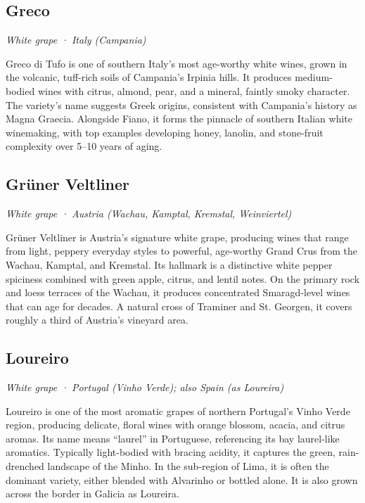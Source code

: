 \subsection*{Greco}
\textit{White grape · Italy (Campania)}\par\smallskip

Greco di Tufo is one of southern Italy’s most age-worthy white wines, grown in the volcanic, tuff-rich soils of Campania’s Irpinia hills. It produces medium-bodied wines with citrus, almond, pear, and a mineral, faintly smoky character. The variety’s name suggests Greek origins, consistent with Campania’s history as Magna Graecia. Alongside Fiano, it forms the pinnacle of southern Italian white winemaking, with top examples developing honey, lanolin, and stone-fruit complexity over 5–10 years of aging.

\subsection*{Grüner Veltliner}
\textit{White grape · Austria (Wachau, Kamptal, Kremstal, Weinviertel)}\par\smallskip

Grüner Veltliner is Austria’s signature white grape, producing wines that range from light, peppery everyday styles to powerful, age-worthy Grand Crus from the Wachau, Kamptal, and Kremstal. Its hallmark is a distinctive white pepper spiciness combined with green apple, citrus, and lentil notes. On the primary rock and loess terraces of the Wachau, it produces concentrated Smaragd-level wines that can age for decades. A natural cross of Traminer and St. Georgen, it covers roughly a third of Austria’s vineyard area.

\subsection*{Loureiro}
\textit{White grape · Portugal (Vinho Verde); also Spain (as Loureira)}\par\smallskip

Loureiro is one of the most aromatic grapes of northern Portugal’s Vinho Verde region, producing delicate, floral wines with orange blossom, acacia, and citrus aromas. Its name means “laurel” in Portuguese, referencing its bay laurel-like aromatics. Typically light-bodied with bracing acidity, it captures the green, rain-drenched landscape of the Minho. In the sub-region of Lima, it is often the dominant variety, either blended with Alvarinho or bottled alone. It is also grown across the border in Galicia as Loureira.

